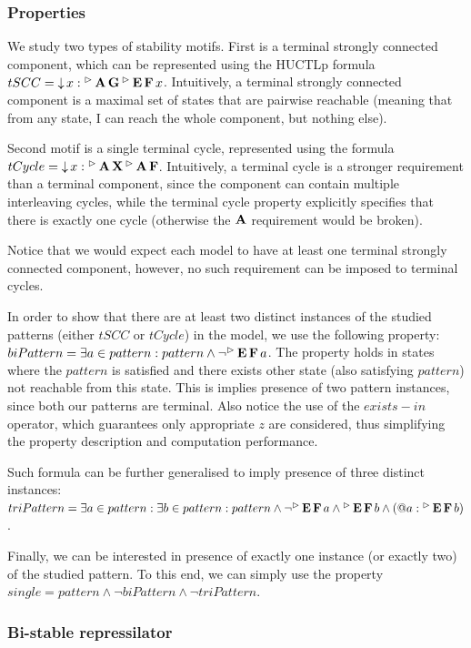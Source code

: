 \subsubsection{\textbf{Properties}}

We study two types of stability motifs. First is a terminal strongly connected component, which can be represented using the \ac{HUCTLp} formula $tSCC = \operatorname{\downarrow} x : {}^\vartriangleright\operatorname{\mathbf{A}}\operatorname{\mathbf{G}} {}^\vartriangleright\operatorname{\mathbf{E}}\operatorname{\mathbf{F}} x$. Intuitively, a terminal strongly connected component is a maximal set of states that are pairwise reachable (meaning that from any state, I can reach the whole component, but nothing else).

Second motif is a single terminal cycle, represented using the formula $tCycle = \operatorname{\downarrow} x : {}^\vartriangleright\operatorname{\mathbf{A}}\operatorname{\mathbf{X}} {}^\vartriangleright\operatorname{\mathbf{A}}\operatorname{\mathbf{F}}$. Intuitively, a terminal cycle is a stronger requirement than a terminal component, since the component can contain multiple interleaving cycles, while the terminal cycle property explicitly specifies that there is exactly one cycle (otherwise the $\operatorname{\mathbf{A}}$ requirement would be broken).

Notice that we would expect each model to have at least one terminal strongly connected component, however, no such requirement can be imposed to terminal cycles.

In order to show that there are at least two distinct instances of the studied patterns (either $tSCC$ or $tCycle$) in the model, we use the following property: $biPattern = \exists a \in pattern : pattern \land \neg {}^\vartriangleright\operatorname{\mathbf{E}}\operatorname{\mathbf{F}} a$. The property holds in states where the $pattern$ is satisfied and there exists other state (also satisfying $pattern$) not reachable from this state. This is implies presence of two pattern instances, since both our patterns are terminal. Also notice the use of the $exists-in$ operator, which guarantees only appropriate $z$ are considered, thus simplifying the property description and computation performance. 

Such formula can be further generalised to imply presence of three distinct instances: $triPattern = \exists a \in pattern : \exists b \in pattern : pattern \land \neg {}^\vartriangleright\operatorname{\mathbf{E}}\operatorname{\mathbf{F}} a \land {}^\vartriangleright\operatorname{\mathbf{E}}\operatorname{\mathbf{F}} b \land (\operatorname{@\!} a : {}^\vartriangleright\operatorname{\mathbf{E}}\operatorname{\mathbf{F}} b)$. 

Finally, we can be interested in presence of exactly one instance (or exactly two) of the studied pattern. To this end, we can simply use the property $single = pattern \land \neg biPattern \land \neg triPattern$. 

\subsubsection{\textbf{Bi-stable repressilator}}

